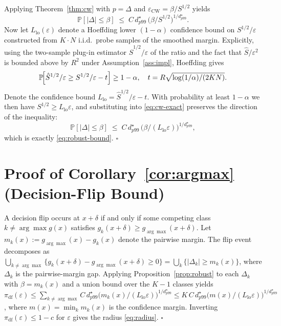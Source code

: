 \documentclass{ieeeaccess}
\newcommand{\Prob}{\mathbb{P}}
\begin{document}
Applying Theorem~\ref{thm:cw} with $p=\Delta$ and
$\varepsilon_{\mathrm{CW}} = \beta / S^{1/2}$ yields
\begin{equation}\label{eq:cw-exact}
  \Prob[|\Delta|\leq \beta] \;\leq\; C\,d^\star_{p99}\,
                                    \bigl(\beta/S^{1/2}\bigr)^{1/d^\star_{p99}}.
\end{equation}
Now let $L_{\mathrm{lo}}(\varepsilon)$ denote a Hoeffding lower
$(1-\alpha)$ confidence bound on $S^{1/2}/\varepsilon$ constructed from
$K\cdot N$ i.i.d.\ probe samples of the smoothed margin. Explicitly,
using the two-sample plug-in estimator $\hat S^{1/2}/\varepsilon$ of
the ratio and the fact that $\hat S/\varepsilon^2$ is bounded above by
$R^2$ under Assumption~\ref{ass:impl}, Hoeffding gives
\begin{equation*}
  \Prob\!\Bigl[\hat S^{1/2}/\varepsilon
                \geq S^{1/2}/\varepsilon - t\Bigr]
  \geq 1-\alpha, \quad
  t = R\sqrt{\log(1/\alpha)/(2KN)}.
\end{equation*}
Denote the confidence bound $L_{\mathrm{lo}}=\hat S^{1/2}/\varepsilon
- t$. With probability at least $1-\alpha$ we then have
$S^{1/2}\geq L_{\mathrm{lo}}\varepsilon$, and substituting into
\eqref{eq:cw-exact} preserves the direction of the inequality:
\begin{equation*}
  \Prob[|\Delta|\leq \beta] \;\leq\;
    C\,d^\star_{p99}\,\bigl(\beta/(L_{\mathrm{lo}}\varepsilon)\bigr)^{1/d^\star_{p99}},
\end{equation*}
which is exactly \eqref{eq:robust-bound}. \hfill$\square$

\section{Proof of Corollary~\ref{cor:argmax} (Decision-Flip Bound)}
A decision flip occurs at $x+\delta$ if and only if some competing
class $k\neq \arg\max g(x)$ satisfies $g_k(x+\delta)\geq g_{\arg\max}(x+\delta)$.
Let $m_k(x):=g_{\arg\max}(x)-g_k(x)$ denote the pairwise margin. The
flip event decomposes as
$\bigcup_{k\neq \arg\max}\{g_k(x+\delta)-g_{\arg\max}(x+\delta)\geq 0\}
 = \bigcup_{k}\{|\Delta_k|\geq m_k(x)\}$,
where $\Delta_k$ is the pairwise-margin gap. Applying
Proposition~\ref{prop:robust} to each $\Delta_k$ with $\beta=m_k(x)$
and a union bound over the $K-1$ classes yields
$\pi_{\mathrm{df}}(\varepsilon)\leq \sum_{k\neq \arg\max}
   C\,d^\star_{p99}\bigl(m_k(x)/(L_{\mathrm{lo}}\varepsilon)\bigr)^{1/d^\star_{p99}}
   \leq K\,C\,d^\star_{p99}
   \bigl(m(x)/(L_{\mathrm{lo}}\varepsilon)\bigr)^{1/d^\star_{p99}}$,
where $m(x)=\min_k m_k(x)$ is the confidence margin.
Inverting $\pi_{\mathrm{df}}(\varepsilon)\leq 1-c$ for $\varepsilon$
gives the radius \eqref{eq:radius}. \hfill$\square$
\end{document}
